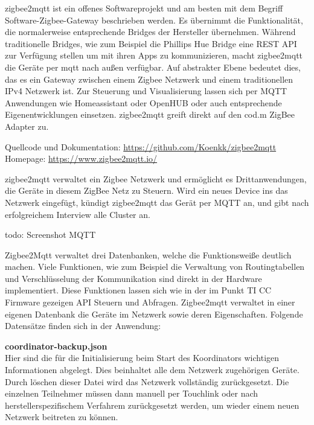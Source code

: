 zigbee2mqtt ist ein offenes Softwareprojekt und am besten mit dem Begriff \grqq Software-Zigbee-Gateway\grqq{} beschrieben werden. Es übernimmt die Funktionalität, die normalerweise entsprechende
Bridges der Hersteller übernehmen. Während traditionelle Bridges, wie zum Beispiel die Phillips Hue Bridge eine REST API zur Verfügung stellen um mit ihren
Apps zu kommunizieren, macht zigbee2mqtt die Geräte per mqtt nach außen verfügbar. Auf abstrakter Ebene bedeutet dies, das es ein Gateway zwischen einem Zigbee Netzwerk und
einem traditionellen IPv4 Netzwerk ist. Zur Steuerung und Visualisierung lassen sich per MQTT Anwendungen wie \grqq Homeassistant\grqq{} oder \grqq OpenHUB\grqq{} oder auch entsprechende
Eigenentwicklungen einsetzen. \grqq zigbee2mqtt\grqq{} greift direkt auf den \grqq cod.m\grqq{} ZigBee Adapter zu.

Quellcode und Dokumentation: \url{https://github.com/Koenkk/zigbee2mqtt}
Homepage: \url{https://www.zigbee2mqtt.io/}

\grqq zigbee2mqtt\grqq{} verwaltet ein Zigbee Netzwerk und ermöglicht es Drittanwendungen, die Geräte in diesem ZigBee Netz zu Steuern. Wird ein neues Device ins das Netzwerk eingefügt,
kündigt zigbee2mqtt das Gerät per MQTT an, und gibt nach erfolgreichem Interview alle Cluster an.

todo: Screenshot MQTT

Zigbee2Mqtt verwaltet drei Datenbanken, welche die Funktionsweiße deutlich machen. Viele Funktionen, wie zum Beispiel die Verwaltung von Routingtabellen und
Verschlüsselung der Kommunikation sind direkt in der Hardware implementiert. Diese Funktionen lassen sich wie in der im Punkt TI CC Firmware gezeigen API Steuern und Abfragen.
Zigbee2mqtt verwaltet in einer eigenen Datenbank die Geräte im Netzwerk sowie deren Eigenschaften.
Folgende Datensätze finden sich in der Anwendung:

\textbf{coordinator-backup.json}\\

Hier sind die für die Initialisierung beim Start des Koordinators wichtigen Informationen abgelegt. Dies beinhaltet alle dem Netzwerk zugehörigen Geräte.
Durch löschen dieser Datei wird das Netzwerk vollständig zurückgesetzt. Die einzelnen Teilnehmer müssen dann manuell per Touchlink oder nach herstellerspezifischem Verfahrem
zurückgesetzt werden, um wieder einem neuen Netzwerk beitreten zu können.


